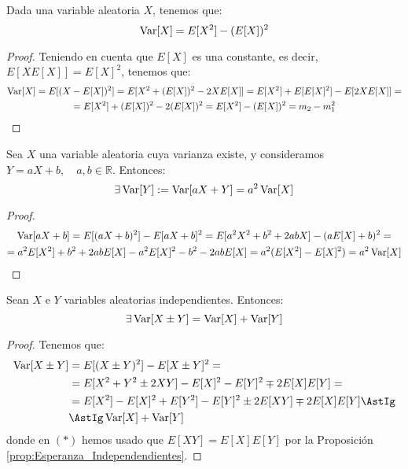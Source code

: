 \begin{prop}
    Dada una variable aleatoria $X$, tenemos que:
    \begin{equation*}
        \operatorname{Var}[X] = E[X^2] - (E[X])^2
    \end{equation*}
\end{prop}
\begin{proof}
    Teniendo en cuenta que $E[X]$ es una constante, es decir, $E[XE[X]]=E[X]^2$, tenemos que:
    \begin{multline*}
        \operatorname{Var}[X] = E[(X-E[X])^2] = E[X^2 + (E[X])^2 - 2XE[X]]
        = E[X^2] + E[E[X]^2] - E[2XE[X]] =\\=
        E[X^2] + (E[X])^2 -2(E[X])^2
        = E[X^2] - (E[X])^2 = m_2-m_1^2
    \end{multline*}
\end{proof}


\begin{prop}
    Sea $X$ una variable aleatoria cuya varianza existe, y consideramos $Y=aX+b,\quad a,b\in \mathbb{R}$. Entonces:
    \begin{equation*}
        \exists \operatorname{Var}[Y] := \operatorname{Var}[aX+Y] = a^2\operatorname{Var}[X]
    \end{equation*}
\end{prop}
\begin{proof}
    \begin{multline*}
        \operatorname{Var}[aX+b]
        = E[(aX+b)^2] -E[aX+b]^2
        = E[a^2X^2 + b^2 +2abX] - (aE[X]+b)^2
        =\\= a^2E[X^2] + b^2 +2abE[X] -a^2E[X]^2 -b^2 -2abE[X] =  a^2(E[X^2] - E[X]^2) = a^2\operatorname{Var}[X]
    \end{multline*}
\end{proof}


\begin{prop}
    Sean $X$ e $Y$ variables aleatorias independientes. Entonces:
    \begin{equation*}
        \exists  \operatorname{Var}[X\pm Y] = \operatorname{Var}[X] + \operatorname{Var}[Y]
    \end{equation*}
\end{prop}
\begin{proof}
    Tenemos que:
    \begin{align*}
        \Var[X \pm Y] &= E[(X\pm Y)^2] - E[X\pm Y]^2
        =\\&= E[X^2 + Y^2 \pm 2XY] - E[X]^2 - E[Y]^2 \mp 2E[X]E[Y]
        =\\&= E[X^2] - E[X]^2 + E[Y^2] -E[Y]^2 \pm 2E[XY] \mp 2E[X]E[Y]
        \AstIg\\&\AstIg \Var[X] + \Var[Y]
    \end{align*}
    donde en $(\ast)$ hemos usado que $E[XY]=E[X]E[Y]$ por la Proposición \ref{prop:Esperanza_Independendientes}.
\end{proof}

